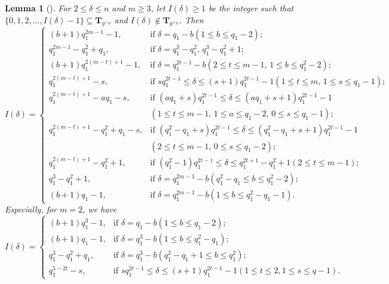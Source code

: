 \documentclass[journal,12pt,onecolumn]{IEEEtran}
\newtheorem{lemma}{Lemma}
\begin{document}
\begin{lemma}[\cite{10068556}]
    \label{Hermitian dual BCH}
    For $2 \leq \delta \leq n$ and $m \geq 3$, let $I(\delta) \geq 1$ be the integer such that $\{0,1,2,\dots,I(\delta)-1\} \subseteq \textbf{T}_{g^{\perp_H}}$ and $I(\delta) \notin \textbf{T}_{g^{\perp_H}}$. Then
    \[
    I(\delta)=
    \begin{cases}
        (b+1)q_1^{2m-1}-1, & \text{if } \delta=q_1-b(1 \leq b \leq q_1-2);\\
        q_1^{2m-1}-q_1^2+q_1, & \text{if } \delta=q_1^3-q_1^2,\, q_1^3-q_1^2+1;\\
        (b+1)q_1^{2(m-t)+1}-1, & \text{if } \delta=q_1^{2t-1}-b(2 \leq t \leq m-1,\, 1 \leq b \leq q_1^2-2);\\
        q_1^{2(m-t)+1}-s, & \text{if } sq_1^{2t-1} \leq \delta \leq (s+1)q_1^{2t-1}-1(1 \leq t \leq m,\, 1 \leq s \leq q_1-1);\\
        q_1^{2(m-t)+1}-aq_1-s, & \text{if } (aq_1+s)q_1^{2t-1} \leq \delta \leq (aq_1+s+1)q_1^{2t-1}-1\\
        &(1 \leq t \leq m-1,\, 1 \leq a \leq q_1-2,\, 0 \leq s \leq q_1-1);\\
        q_1^{2(m-t)+1}-q_1^2+q_1-s, & \text{if } (q_1^2-q_1+s)q_1^{2t-1} \leq \delta \leq (q_1^2-q_1+s+1)q_1^{2t-1}-1\\
        &(2 \leq t \leq m-1,\, 0 \leq s \leq q_1-2);\\
        q_1^{2(m-t)+1}-q_1^2+1, & \text{if } (q_1^2-1)q_1^{2t-1} \leq \delta \leq q_1^{2t+1}-q_1^2+1(2 \leq t \leq m-1);\\
        q_1^3-q_1^2+1, & \text{if } \delta=q_1^{2m-1}-b(q_1^2-q_1 \leq b \leq q_1^2-2);\\
        (b+1)q_1-1, & \text{if } \delta=q_1^{2m-1}-b(1 \leq b \leq q_1^2-q_1-1).
    \end{cases}
    \]
    Especially, for $m=2$, we have
    \[
    I(\delta)=
    \begin{cases}
        (b+1)q_1^3-1, & \text{if } \delta=q_1-b(1 \le b\le q_1-2);\\
        (b+1)q_1-1, & \text{if } \delta=q_1^3-b(1\le b\le q_1^2-q_1);\\
        q_1^3-q_1^2+q_1, & \text{if } \delta=q_1^3-b(q_1^2-q_1+1\le b\le q_1^2);\\
        q_1^{5-2t}-s, & \text{if } sq_1^{2t-1}\le \delta\le (s+1)q_1^{2t-1}-1(1\le t\le 2,1\le s\le q-1).
    \end{cases}
    \]
\end{lemma}
    
\end{document}
